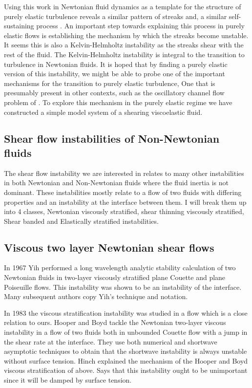 \documentclass{jfm}
\begin{document}
Using this work in Newtonian fluid dynamics as a template for the structure of
purely elastic turbulence reveals a similar pattern of streaks and, a similar
self-sustaining process \citep{Searle2016a}. An important step towards
explaining this process in purely elastic flows is establishing the mechanism
by which the streaks become unstable. It seems this is also a Kelvin-Helmholtz
instability as the streaks shear with the rest of the fluid.  The
Kelvin-Helmholtz instability is integral to the transition to turbulence in
Newtonian fluids. It is hoped that by finding a purely elastic version of this
instability, we might be able to probe one of the important mechanisms for the
transition to purely elastic turbulence, One that is presumably present in
other contexts, such as the oscillatory channel flow problem of
\cite{Searle2016b}. To explore this mechanism in the purely elastic regime we
have constructed a simple model system of a shearing viscoelastic fluid.

\subsection{Shear flow instabilities of Non-Newtonian fluids}

The shear flow instability we are interested in relates to many other
instabilities in both Newtonian and Non-Newtonian fluids where the fluid
inertia is not dominant. These instabilities mostly relate to a flow of two
fluids with differing properties and an instability at the interface between
them. I will break them up into 4 classes, Newtonian viscously stratified, shear
thinning viscously stratified, Shear banded and Elastically stratified
instabilities.

\subsection{Viscous two layer Newtonian shear flows}

In 1967 Yih \citep{Yih1967} performed a long wavelength analytic stability
calculation of two Newtonian fluids in two-layer viscously stratified plane
Couette and plane Poiseuille flows. This instability was shown to be an
instability of the interface. Many subsequent authors copy Yih's technique and
notation.

In 1983 the viscous stratification instability was studied in a flow which is a
close relation to ours. Hooper and Boyd tackle the Newtonian two-layer viscous
instability \citep{Hooper1983} in a flow of two fluids both in unbounded
Couette flow with a jump in the shear rate at the interface. They use both
numerical and shortwave asymptotic techniques to obtain that the shortwave
instability is always unstable without surface tension. Hinch \citep{Hinch1984}
explained the mechanism of the Hooper and Boyd viscous stratification of above.
Says that this instability ought to be unimportant since it will be damped by
surface tension.
\end{document}
